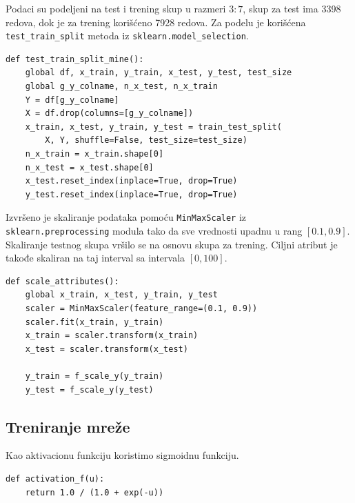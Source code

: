 \documentclass[a4paper]{article}
\begin{document}
 Podaci su podeljeni na test i trening skup u razmeri $3:7$, skup za test ima 3398 redova, dok je za trening korišćeno 7928 redova. Za podelu je korišćena \texttt{test\_train\_split} metoda iz \texttt{sklearn.model\_selection}.


\begin{verbatim}
def test_train_split_mine():
    global df, x_train, y_train, x_test, y_test, test_size
    global g_y_colname, n_x_test, n_x_train
    Y = df[g_y_colname]
    X = df.drop(columns=[g_y_colname])
    x_train, x_test, y_train, y_test = train_test_split(
        X, Y, shuffle=False, test_size=test_size)
    n_x_train = x_train.shape[0]
    n_x_test = x_test.shape[0]
    x_test.reset_index(inplace=True, drop=True)
    y_test.reset_index(inplace=True, drop=True)
\end{verbatim}

Izvršeno je skaliranje podataka pomoću \texttt{MinMaxScaler} iz \texttt{sklearn.preprocessing} modula tako da sve vrednosti upadnu u rang $[0.1, 0.9]$. Skaliranje testnog skupa vršilo se na osnovu skupa za trening. Ciljni atribut je takođe skaliran na taj interval sa intervala $[0, 100]$.

\begin{verbatim}
def scale_attributes():
    global x_train, x_test, y_train, y_test
    scaler = MinMaxScaler(feature_range=(0.1, 0.9))
    scaler.fit(x_train, y_train)
    x_train = scaler.transform(x_train)
    x_test = scaler.transform(x_test)

    y_train = f_scale_y(y_train)
    y_test = f_scale_y(y_test)
\end{verbatim}

\subsection{Treniranje mreže}

Kao aktivacionu funkciju koristimo sigmoidnu funkciju.
\begin{verbatim}
def activation_f(u):
    return 1.0 / (1.0 + exp(-u))
\end{verbatim}
\end{document}
